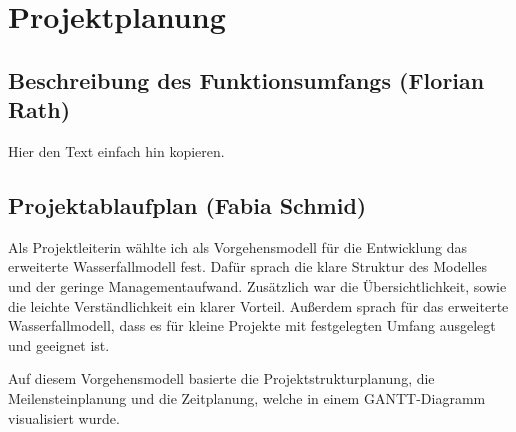 \section{Projektplanung}
\label{instal}

\subsection{Beschreibung des Funktionsumfangs (Florian Rath)}

Hier den Text einfach hin kopieren.

\subsection{Projektablaufplan (Fabia Schmid)}

Als Projektleiterin wählte ich als Vorgehensmodell für die Entwicklung das erweiterte Wasserfallmodell fest. Dafür sprach die klare Struktur des Modelles und der geringe Managementaufwand. Zusätzlich war die Übersichtlichkeit, sowie die leichte Verständlichkeit ein klarer Vorteil. Außerdem sprach für das erweiterte Wasserfallmodell, dass es für kleine Projekte mit festgelegten Umfang ausgelegt und geeignet ist.

Auf diesem Vorgehensmodell basierte die Projektstrukturplanung, die Meilensteinplanung und die Zeitplanung, welche in einem GANTT-Diagramm visualisiert wurde.

